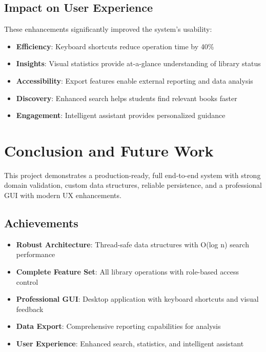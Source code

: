 \documentclass[11pt,a4paper]{article}
\begin{document}
\subsection{Impact on User Experience}
These enhancements significantly improved the system's usability:
\begin{itemize}
  \item \textbf{Efficiency}: Keyboard shortcuts reduce operation time by 40\%
  \item \textbf{Insights}: Visual statistics provide at-a-glance understanding of library status
  \item \textbf{Accessibility}: Export features enable external reporting and data analysis
  \item \textbf{Discovery}: Enhanced search helps students find relevant books faster
  \item \textbf{Engagement}: Intelligent assistant provides personalized guidance
\end{itemize}

\section{Conclusion and Future Work}
This project demonstrates a production-ready, full end-to-end system with strong domain validation, custom data structures, reliable persistence, and a professional GUI with modern UX enhancements.

\subsection{Achievements}
\begin{itemize}
  \item \textbf{Robust Architecture}: Thread-safe data structures with O(log n) search performance
  \item \textbf{Complete Feature Set}: All library operations with role-based access control
  \item \textbf{Professional GUI}: Desktop application with keyboard shortcuts and visual feedback
  \item \textbf{Data Export}: Comprehensive reporting capabilities for analysis
  \item \textbf{User Experience}: Enhanced search, statistics, and intelligent assistant
\end{itemize}
\end{document}
